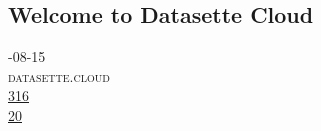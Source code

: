 \documentclass[10pt,a4paper]{article}
\begin{document}
\subsection{Welcome to Datasette Cloud}
\noindent\begin{minipage}[t]{0.20\linewidth}
\vspace{0pt}
\noindent\textsc{\footnotesize
{\scriptsize\faCalendar}-08-15 \\
{\scriptsize\faGlobe}\space 
datasette.cloud \\
{\scriptsize\faThumbsOUp}\space 
\href{http://news.ycombinator.com/item?id=37196461\&utm\_term=comment}{316} \\
{\scriptsize\faComments}\space 
\href{http://news.ycombinator.com/item?id=37196461\&utm\_term=comment}{20} \\
}
\end{minipage} 
\end{document}
